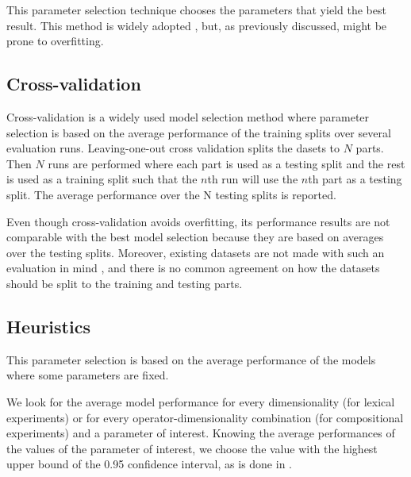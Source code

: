 This parameter selection technique chooses the parameters that yield the best result. This method is widely adopted \cite{mitchell-lapata:2008:ACLMain,Grefenstette:2011:ESC:2145432.2145580,milajevs-purver:2014:CVSC,milajevs-EtAl:2014:EMNLP2014}, but, as previously discussed, might be prone to overfitting.
%
%

\subsection{Cross-validation}

Cross-validation \cite{Ney1997} is a widely used model selection method where parameter selection is based on the average performance of the training splits over several evaluation runs. Leaving-one-out cross validation splits the dasets to $N$ parts. Then $N$ runs are performed where each part is used as a testing split and the rest is used as a training split such that the $n$th run will use the $n$th part as a testing split. The average performance over the N testing splits is reported.

Even though cross-validation avoids overfitting, its performance results are not comparable with the best model selection because they are based on averages over the testing splits. Moreover, existing datasets are not made with such an evaluation in mind \cite{W16-2506}, and there is no common agreement on how the datasets should be split to the training and testing parts.

\subsection{Heuristics}

This parameter selection is based on the average performance of the models where some parameters are fixed.

We look for the average model performance for every dimensionality (for lexical experiments) or for every operator-dimensionality combination (for compositional experiments) and a parameter of interest. Knowing the average performances of the values of the parameter of interest, we choose the value with the highest upper bound of the 0.95 confidence interval, as is done in .

